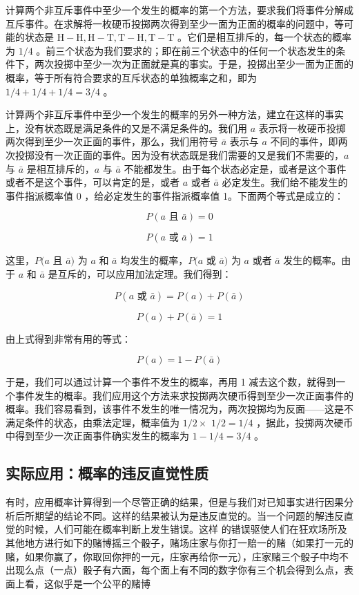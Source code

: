 计算两个非互斥事件中至少一个发生的概率的第一个方法，要求我们将事件分解成互斥事件。在求解将一枚硬币投掷两次得到至少一面为正面的概率的问题中，等可能的状态是 $\mathrm{H}-\mathrm{H}, \mathrm{H}-\mathrm{T}, \mathrm{T}-\mathrm{H}, \mathrm{T}-\mathrm{T}$ 。它们是相互排斥的，每一个状态的概率为 $1 / 4$ 。前三个状态为我们要求的；即在前三个状态中的任何一个状态发生的条件下，两次投掷中至少一次为正面就是真的事实。于是，投掷出至少一面为正面的概率，等于所有符合要求的互斥状态的单独概率之和，即为 $1 / 4+1 / 4+1 / 4=3 / 4$ 。

计算两个非互斥事件中至少一个发生的概率的另外一种方法，建立在这样的事实上，没有状态既是满足条件的又是不满足条件的。我们用 $a$ 表示将一枚硬币投掷两次得到至少一次正面的事件，那么，我们用符号 $\bar{a}$ 表示与 $a$ 不同的事件，即两次投掷没有一次正面的事件。因为没有状态既是我们需要的又是我们不需要的，$a$ 与 $\bar{a}$ 是相互排斥的，$a$ 与 $\bar{a}$ 不能都发生。由于每个状态必定是，或者是这个事件或者不是这个事件，可以肯定的是，或者 $a$ 或者 $\bar{a}$ 必定发生。我们给不能发生的事件指派概率值 0 ，给必定发生的事件指派概率值 1。下面两个等式是成立的：

$$
P(a \text { 且 } \bar{a})=0
$$

$$
P(a \text { 或 } \bar{a})=1
$$

这里，$P(a$ 且 $\bar{a})$ 为 $a$ 和 $\bar{a}$ 均发生的概率，$P(a$ 或 $\bar{a})$ 为 $a$ 或者 $\bar{a}$ 发生的概率。由于 $a$ 和 $\bar{a}$ 是互斥的，可以应用加法定理。我们得到：

$$
P(a \text { 或 } \bar{a})=P(a)+P(\bar{a})
$$

$$
P(a)+P(\bar{a})=1
$$

由上式得到非常有用的等式：

$$
P(a)=1-P(\bar{a})
$$

于是，我们可以通过计算一个事件不发生的概率，再用 1 减去这个数，就得到一个事件发生的概率。我们应用这个方法来求投掷两次硬币得到至少一次正面事件的概率。我们容易看到，该事件不发生的唯一情况为，两次投掷均为反面——这是不满足条件的状态，由乘法定理，概率值为 $1 / 2 \times$ $1 / 2=1 / 4$ ，据此，投掷两次硬币中得到至少一次正面事件确实发生的概率为 $1-1 / 4=3 / 4$ 。

\subsection{实际应用：概率的违反直觉性质}

有时，应用概率计算得到一个尽管正确的结果，但是与我们对已知事实进行因果分析后所期望的结论不同。这样的结果被认为是违反直觉的。当一个问题的解违反直觉的时候，人们可能在概率判断上发生错误。这样 的错误驱使人们在狂欢场所及其他地方进行如下的赌博摇三个骰子，赌场庄家与你打一赔一的赌（如果打一元的赌，如果你赢了，你取回你押的一元，庄家再给你一元），庄家赌三个骰子中均不出现么点（一点）骰子有六面，每个面上有不同的数字你有三个机会得到么点，表面上看，这似乎是一个公平的赌博

